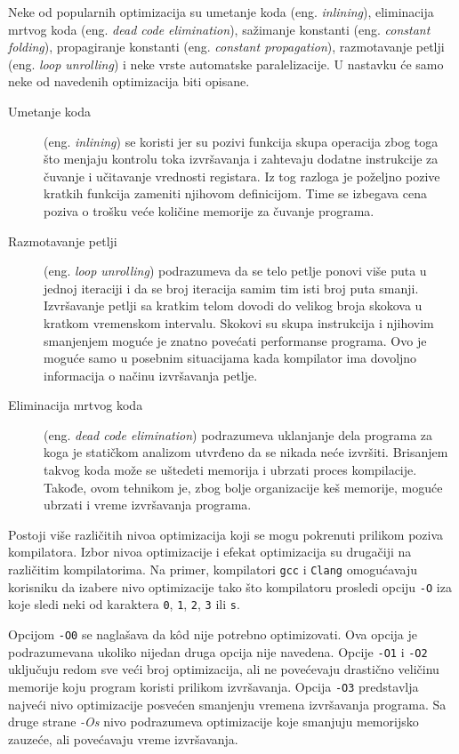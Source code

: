 \documentclass[12pt,oneside]{memoir}
\begin{document}
Neke od popularnih optimizacija su umetanje koda (eng. \textit{inlining}), eliminacija mrtvog koda (eng. \textit{dead code elimination}), sažimanje konstanti (eng. \textit{constant folding}), propagiranje konstanti (eng. \textit{constant propagation}), razmotavanje petlji (eng. \textit{loop unrolling}) i neke vrste automatske paralelizacije. U nastavku će samo neke od navedenih optimizacija biti opisane.

\begin{description}
    \item[Umetanje koda] (eng. \textit{inlining}) se koristi jer su pozivi funkcija skupa operacija zbog toga što menjaju kontrolu toka izvršavanja i zahtevaju dodatne instrukcije za čuvanje i učitavanje vrednosti registara. Iz tog razloga je poželjno pozive kratkih funkcija zameniti njihovom definicijom. Time se izbegava cena poziva o trošku veće količine memorije za čuvanje programa.
    \item[Razmotavanje petlji] (eng. \textit{loop unrolling}) podrazumeva da se telo petlje ponovi više puta u jednoj iteraciji i da se broj iteracija samim tim isti broj puta smanji. Izvršavanje petlji sa kratkim telom dovodi do velikog broja skokova u kratkom vremenskom intervalu. Skokovi su skupa instrukcija i njihovim smanjenjem moguće je znatno povećati performanse programa. Ovo je moguće samo u posebnim situacijama kada kompilator ima dovoljno informacija o načinu izvršavanja petlje.

    \item[Eliminacija mrtvog koda] (eng. \textit{dead code elimination}) podrazumeva uklanjanje dela programa za koga je statičkom analizom utvrđeno da se nikada neće izvršiti. Brisanjem takvog koda može se uštedeti memorija i ubrzati proces kompilacije. Takođe, ovom tehnikom je, zbog bolje organizacije keš memorije, moguće ubrzati i vreme izvršavanja programa.
\end{description}

Postoji više različitih nivoa optimizacija koji se mogu pokrenuti prilikom poziva kompilatora. Izbor nivoa optimizacije i efekat optimizacija su drugačiji na različitim kompilatorima. Na primer, kompilatori \texttt{gcc} i \texttt{Clang} omogućavaju korisniku da izabere nivo optimizacije tako što kompilatoru prosledi opciju \texttt{-O} iza koje sledi neki od karaktera \texttt{0}, \texttt{1}, \texttt{2}, \texttt{3} ili \texttt{s}. 

Opcijom \texttt{-O0} se naglašava da k\^od nije potrebno optimizovati. Ova opcija je podrazumevana ukoliko nijedan druga opcija nije navedena. Opcije \texttt{-O1} i \texttt{-O2} uključuju redom sve veći broj optimizacija, ali ne povećevaju drastično veličinu memorije koju program koristi prilikom izvršavanja. Opcija \texttt{-O3} predstavlja najveći nivo optimizacije posvećen smanjenju vremena izvršavanja programa. Sa druge strane \textit{-Os} nivo podrazumeva optimizacije koje smanjuju memorijsko zauzeće, ali povećavaju vreme izvršavanja. 
\end{document}
